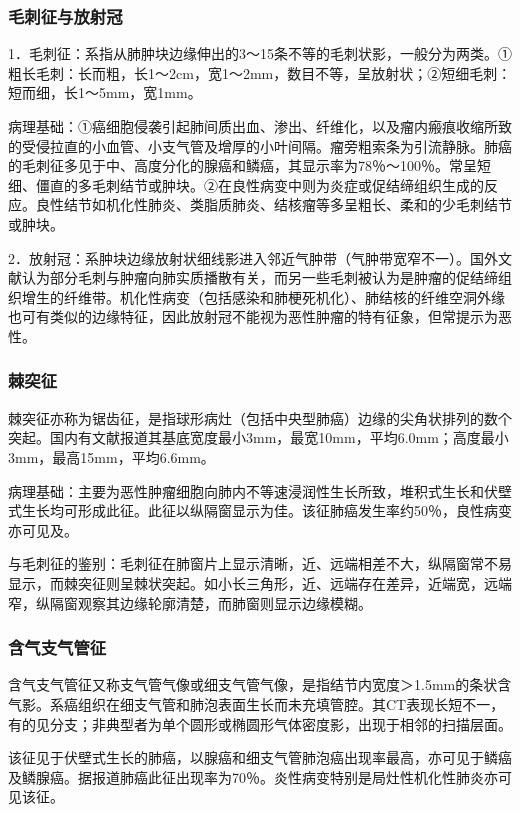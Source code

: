 \subsubsection{毛刺征与放射冠}

1．毛刺征：系指从肺肿块边缘伸出的3～15条不等的毛刺状影，一般分为两类。①粗长毛刺：长而粗，长1～2cm，宽1～2mm，数目不等，呈放射状；②短细毛刺：短而细，长1～5mm，宽1mm。

病理基础：①癌细胞侵袭引起肺间质出血、渗出、纤维化，以及瘤内瘢痕收缩所致的受侵拉直的小血管、小支气管及增厚的小叶间隔。瘤旁粗索条为引流静脉。肺癌的毛刺征多见于中、高度分化的腺癌和鳞癌，其显示率为78％～100％。常呈短细、僵直的多毛刺结节或肿块。②在良性病变中则为炎症或促结缔组织生成的反应。良性结节如机化性肺炎、类脂质肺炎、结核瘤等多呈粗长、柔和的少毛刺结节或肿块。

2．放射冠：系肿块边缘放射状细线影进入邻近气肿带（气肿带宽窄不一）。国外文献认为部分毛刺与肿瘤向肺实质播散有关，而另一些毛刺被认为是肿瘤的促结缔组织增生的纤维带。机化性病变（包括感染和肺梗死机化）、肺结核的纤维空洞外缘也可有类似的边缘特征，因此放射冠不能视为恶性肿瘤的特有征象，但常提示为恶性。

\subsubsection{棘突征}

棘突征亦称为锯齿征，是指球形病灶（包括中央型肺癌）边缘的尖角状排列的数个突起。国内有文献报道其基底宽度最小3mm，最宽10mm，平均6.0mm；高度最小3mm，最高15mm，平均6.6mm。

病理基础：主要为恶性肿瘤细胞向肺内不等速浸润性生长所致，堆积式生长和伏壁式生长均可形成此征。此征以纵隔窗显示为佳。该征肺癌发生率约50％，良性病变亦可见及。

与毛刺征的鉴别：毛刺征在肺窗片上显示清晰，近、远端相差不大，纵隔窗常不易显示，而棘突征则呈棘状突起。如小长三角形，近、远端存在差异，近端宽，远端窄，纵隔窗观察其边缘轮廓清楚，而肺窗则显示边缘模糊。

\subsubsection{含气支气管征}

含气支气管征又称支气管气像或细支气管气像，是指结节内宽度＞1.5mm的条状含气影。系癌组织在细支气管和肺泡表面生长而未充填管腔。其CT表现长短不一，有的见分支；非典型者为单个圆形或椭圆形气体密度影，出现于相邻的扫描层面。

该征见于伏壁式生长的肺癌，以腺癌和细支气管肺泡癌出现率最高，亦可见于鳞癌及鳞腺癌。据报道肺癌此征出现率为70％。炎性病变特别是局灶性机化性肺炎亦可见该征。

